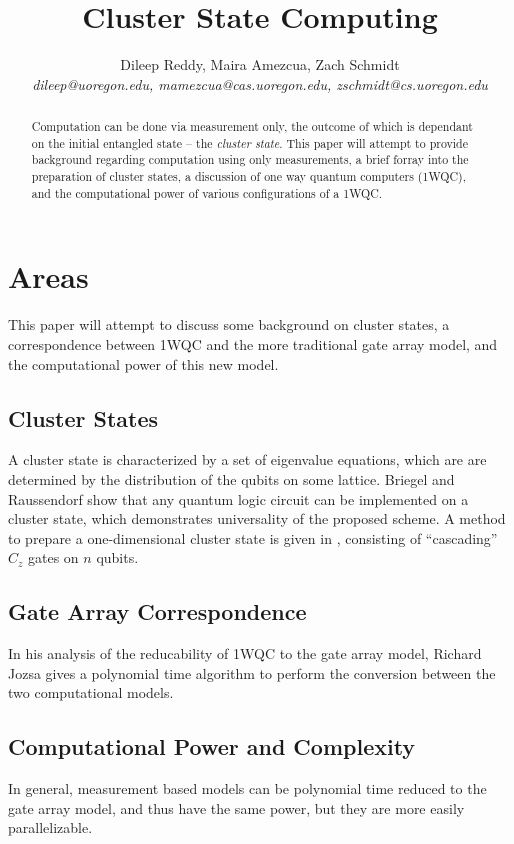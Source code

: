 \documentclass[twocolumn]{IEEEtran11}
\begin{document}


\title{\Large \bf Cluster State Computing}
\author{
Dileep Reddy, Maira Amezcua, Zach Schmidt \\
{\em dileep@uoregon.edu, mamezcua@cas.uoregon.edu, zschmidt@cs.uoregon.edu }
}
\maketitle

\begin{abstract}
Computation can be done via measurement only, the outcome of which is dependant on the initial entangled state -- the \textit{cluster state}. This paper will attempt to provide background regarding computation using only measurements, a brief forray into the preparation of cluster states, a discussion of one way quantum computers (1WQC), and the computational power of various configurations of a 1WQC.
\end{abstract}


\section{Areas}
This paper will attempt to discuss some background on cluster states, a correspondence between 1WQC and the more traditional gate array model, and the computational power of this new model.

\subsection{Cluster States}
A cluster state is characterized by a set of eigenvalue equations, which are are determined by the distribution of the qubits on some lattice\cite{briegel2001persistent}.
Briegel and Raussendorf show that any quantum logic circuit can be implemented on a cluster state, which demonstrates universality of the proposed scheme\cite{briegel2000measurements}. A method to prepare a one-dimensional cluster state is given in \cite{jorrand2005unifying}, consisting of ``cascading'' $C_z
$ gates on $n$ qubits.

\subsection{Gate Array Correspondence}
In his analysis of the reducability of 1WQC to the gate array model, Richard Jozsa gives a polynomial time algorithm to perform the conversion between the two computational models\cite{jozsa2006introduction}. 

\subsection{Computational Power and Complexity}
In general, measurement based models can be polynomial time reduced to the gate array model, and thus have the same power, but they are more easily parallelizable\cite{jozsa2006introduction}.



\end{document}
